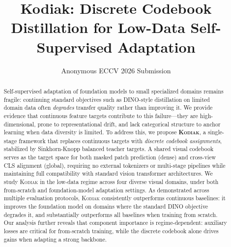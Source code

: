 \documentclass[runningheads]{llncs}
\newcommand{\method}{\textsc{Kodiak}}
\begin{document}
\title{Kodiak: Discrete Codebook Distillation for Low-Data Self-Supervised Adaptation}


\author{Anonymous ECCV 2026 Submission}



\maketitle


\begin{abstract}
Self-supervised adaptation of foundation models to small specialized domains remains fragile: continuing standard objectives such as DINO-style distillation on limited domain data often \emph{degrades} transfer quality rather than improving it.
We provide evidence that continuous feature targets contribute to this failure---they are high-dimensional, prone to representational drift, and lack categorical structure to anchor learning when data diversity is limited.
To address this, we propose \textbf{\method{}}, a single-stage framework that replaces continuous targets with \emph{discrete codebook assignments}, stabilized by Sinkhorn-Knopp balanced teacher targets.
A shared visual codebook serves as the target space for both masked patch prediction (dense) and cross-view CLS alignment (global), requiring no external tokenizers or multi-stage pipelines while maintaining full compatibility with standard vision transformer architectures.
We study \method{} in the low-data regime across four diverse visual domains, under both from-scratch and foundation-model adaptation settings.
As demonstrated across multiple evaluation protocols, \method{} consistently outperforms continuous baselines: it improves the foundation model on domains where the standard DINO objective degrades it, and substantially outperforms all baselines when training from scratch.
Our analysis further reveals that component importance is regime-dependent: auxiliary losses are critical for from-scratch training, while the discrete codebook alone drives gains when adapting a strong backbone.
\end{abstract}
\end{document}
